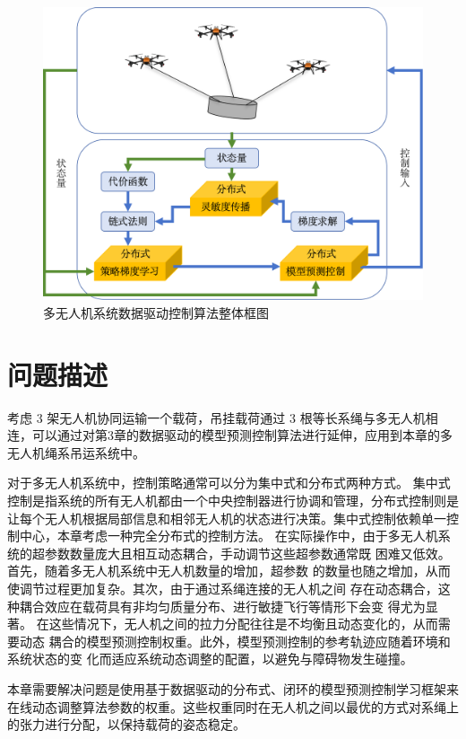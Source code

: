 \documentclass[lang=chs, degree=master, blindreview=false, winfonts=true]{yanputhesis}
\begin{document}
\begin{figure}[hbt!]
	\centering
	\includegraphics[width=38pc]{picture/4_1.png} 
	\caption{多无人机系统数据驱动控制算法整体框图} 
	\label{4_1}
\end{figure}


\section{问题描述}
考虑 3 架无人机协同运输一个载荷，吊挂载荷通过 3 根等长系绳与多无人机相连，可以通过对第3章的数据驱动的模型预测控制算法进行延伸，应用到本章的多无人机绳系吊运系统中。

对于多无人机系统中，控制策略通常可以分为集中式和分布式两种方式。
集中式控制是指系统的所有无人机都由一个中央控制器进行协调和管理，分布式控制则是让每个无人机根据局部信息和相邻无人机的状态进行决策。集中式控制依赖单一控制中心，本章考虑一种完全分布式的控制方法。
在实际操作中，由于多无人机系统的超参数数量庞大且相互动态耦合，手动调节这些超参数通常既
困难又低效。首先，随着多无人机系统中无人机数量的增加，超参数
的数量也随之增加，从而使调节过程更加复杂。其次，由于通过系绳连接的无人机之间
存在动态耦合，这种耦合效应在载荷具有非均匀质量分布、进行敏捷飞行等情形下会变
得尤为显著。
在这些情况下，无人机之间的拉力分配往往是不均衡且动态变化的，从而需要动态
耦合的模型预测控制权重。此外，模型预测控制的参考轨迹应随着环境和系统状态的变
化而适应系统动态调整的配置，以避免与障碍物发生碰撞。

本章需要解决问题是使用基于数据驱动的分布式、闭环的模型预测控制学习框架来在线动态调整算法参数的权重。这些权重同时在无人机之间以最优的方式对系绳上的张力进行分配，以保持载荷的姿态稳定。
\end{document}
